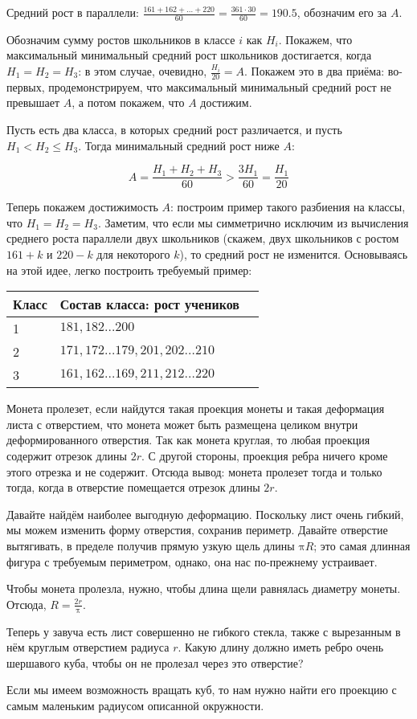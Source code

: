 \begin{itemize}
\itA Средний рост в параллели: $\frac{161 + 162 + \ldots + 220}{60} = \frac{361\cdot 30}{60} = 190.5$,
обозначим его за $A$.

Обозначим сумму ростов школьников в классе $i$ как $H_i$. Покажем, что максимальный 
минимальный средний рост школьников достигается, когда $H_1 = H_2 = H_3$: в этом случае,
очевидно, $\frac{H_i}{20} = A$. Покажем это в два приёма: во-первых, продемонстрируем,
что максимальный минимальный средний рост не превышает $A$, а потом покажем, что
$A$ достижим.

Пусть есть два класса, в которых средний рост различается, и пусть $H_1 < H_2 \le H_3$. 
Тогда минимальный средний рост ниже $A$: 

$$A = \frac{H_1 + H_2 + H_3}{60} > \frac{3H_1}{60} = \frac{H_1}{20}$$

Теперь покажем достижимость $A$: построим пример такого разбиения на классы,
что $H_1 = H_2 = H_3$.
Заметим, что если мы симметрично исключим из вычисления среднего роста параллели двух 
школьников (скажем, двух школьников с ростом $161+k$ и $220-k$ для некоторого $k$), 
то средний рост не изменится. Основываясь на этой идее, легко построить требуемый
пример:

\begin{center}\begin{tabular}{lll}
Класс & Состав класса: рост учеников \\
\hline
1 & $181, 182 \ldots 200$\\
2 & $171, 172 \ldots 179, 201, 202 \ldots 210$ \\
3 & $161, 162 \ldots 169, 211, 212 \ldots 220$
\end{tabular}\end{center}

\itB Монета пролезет, если найдутся такая проекция монеты и такая деформация 
листа с отверстием, что монета может быть размещена целиком внутри деформированного
отверстия. Так как монета круглая, то любая проекция содержит отрезок длины $2r$. 
С другой стороны, проекция ребра ничего кроме этого отрезка и не содержит. 
Отсюда вывод: монета пролезет тогда и только тогда, когда в отверстие помещается 
отрезок длины $2r$.

Давайте найдём наиболее выгодную деформацию.
Поскольку лист очень гибкий, мы можем изменить форму отверстия, сохранив периметр.
Давайте отверстие вытягивать, в пределе получив прямую узкую щель длины $\text{π}R$; это
самая длинная фигура с требуемым периметром, однако, она нас по-прежнему устраивает.

Чтобы монета пролезла, нужно, чтобы длина щели равнялась диаметру монеты. Отсюда, $R = \frac{2r}{\text{π}}$.

\itC Теперь у завуча есть лист совершенно не гибкого стекла, также с вырезанным в нём круглым отверстием 
радиуса $r$. Какую длину должно иметь ребро очень шершавого куба, чтобы он не пролезал через это отверстие?

Если мы имеем возможность вращать куб, то нам нужно найти его проекцию с самым маленьким
радиусом описанной окружности. 

\end{itemize}
